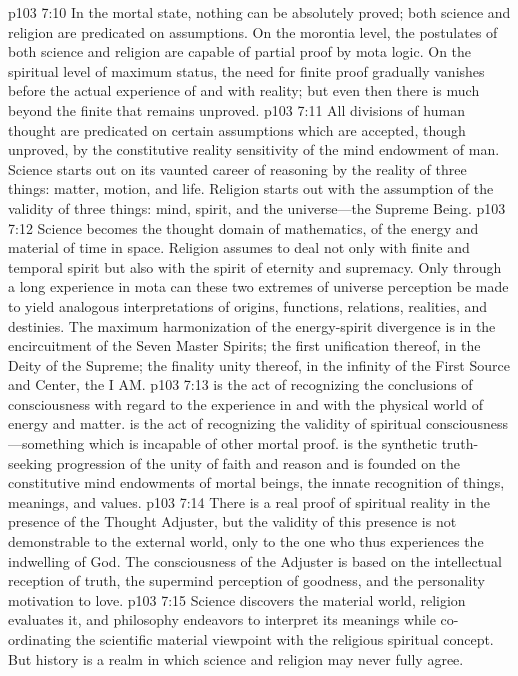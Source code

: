 \pc \vs p103 7:10 In the mortal state, nothing can be absolutely proved; both science and religion are predicated on assumptions. On the morontia level, the postulates of both science and religion are capable of partial proof by mota logic. On the spiritual level of maximum status, the need for finite proof gradually vanishes before the actual experience of and with reality; but even then there is much beyond the finite that remains unproved.
\vs p103 7:11 All divisions of human thought are predicated on certain assumptions which are accepted, though unproved, by the constitutive reality sensitivity of the mind endowment of man. Science starts out on its vaunted career of reasoning by  the reality of three things: matter, motion, and life. Religion starts out with the assumption of the validity of three things: mind, spirit, and the universe---the Supreme Being.
\vs p103 7:12 Science becomes the thought domain of mathematics, of the energy and material of time in space. Religion assumes to deal not only with finite and temporal spirit but also with the spirit of eternity and supremacy. Only through a long experience in mota can these two extremes of universe perception be made to yield analogous interpretations of origins, functions, relations, realities, and destinies. The maximum harmonization of the energy\hyp{}spirit divergence is in the encircuitment of the Seven Master Spirits; the first unification thereof, in the Deity of the Supreme; the finality unity thereof, in the infinity of the First Source and Center, the I AM.
\pc \vs p103 7:13  is the act of recognizing the conclusions of consciousness with regard to the experience in and with the physical world of energy and matter.  is the act of recognizing the validity of spiritual consciousness---something which is incapable of other mortal proof.  is the synthetic truth\hyp{}seeking progression of the unity of faith and reason and is founded on the constitutive mind endowments of mortal beings, the innate recognition of things, meanings, and values.
\pc \vs p103 7:14 There is a real proof of spiritual reality in the presence of the Thought Adjuster, but the validity of this presence is not demonstrable to the external world, only to the one who thus experiences the indwelling of God. The consciousness of the Adjuster is based on the intellectual reception of truth, the supermind perception of goodness, and the personality motivation to love.
\vs p103 7:15 Science discovers the material world, religion evaluates it, and philosophy endeavors to interpret its meanings while co\hyp{}ordinating the scientific material viewpoint with the religious spiritual concept. But history is a realm in which science and religion may never fully agree.
